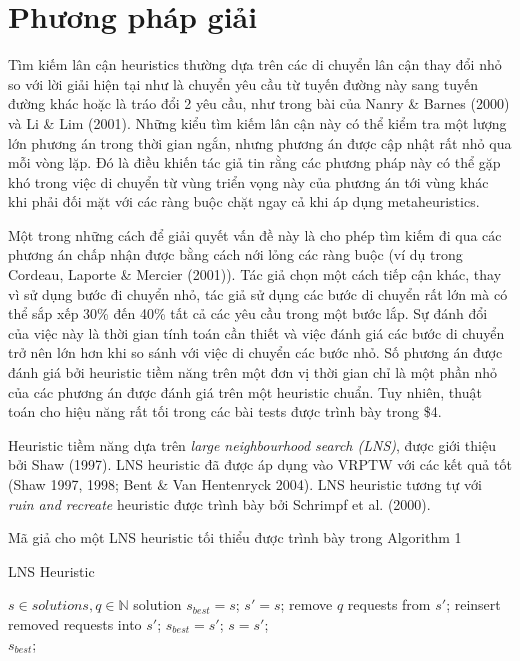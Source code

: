 \chapter{Phương pháp giải}
Tìm kiếm lân cận heuristics thường dựa trên các di chuyển lân cận thay đổi nhỏ so với lời giải hiện tại như là chuyển yêu cầu từ tuyến đường này sang tuyến đường khác hoặc là tráo đổi 2 yêu cầu, như trong bài của Nanry \& Barnes (2000) và Li \& Lim (2001). Những kiểu tìm kiếm lân cận này có thể kiểm tra một lượng lớn phương án trong thời gian ngắn, nhưng phương án được cập nhật rất nhỏ qua mỗi vòng lặp. Đó là điều khiến tác giả tin rằng các phương pháp này có thể gặp khó trong việc di chuyển từ vùng triển vọng này của phương án tới vùng khác khi phải đối mặt với các ràng buộc chặt ngay cả khi áp dụng metaheuristics.

Một trong những cách để giải quyết vấn đề này là cho phép tìm kiếm đi qua các phương án chấp nhận được bằng cách nới lỏng các ràng buộc (ví dụ trong Cordeau, Laporte \& Mercier (2001)). Tác giả chọn một cách tiếp cận khác, thay vì sử dụng bước đi chuyển nhỏ, tác giả sử dụng các bước di chuyển rất lớn mà có thể sắp xếp 30\% đến 40\% tất cả các yêu cầu trong một bước lắp. Sự đánh đổi của việc này là thời gian tính toán cần thiết và việc đánh giá các bước di chuyển trở nên lớn hơn khi so sánh với việc di chuyển các bước nhỏ. Số phương án được đánh giá bởi heuristic tiềm năng trên một đơn vị thời gian chỉ là một phần nhỏ của các phương án được đánh giá trên một heuristic chuẩn. Tuy nhiên, thuật toán cho hiệu năng rất tối trong các bài tests được trình bày trong \$4.

Heuristic tiềm năng dựa trên \textit{large neighbourhood search (LNS)}, được giới thiệu bởi Shaw (1997). LNS heuristic đã được áp dụng vào VRPTW với các kết quả tốt (Shaw 1997, 1998; Bent \& Van Hentenryck 2004). LNS heuristic tương tự với \textit{ruin and recreate} heuristic được trình bày bởi Schrimpf et al. (2000).

Mã giả cho một LNS heuristic tối thiểu được trình bày trong Algorithm 1

\begin{algorithm}
	\caption{LNS Heuristic} 
	\begin{algorithmic}[1]
        \Require $s \in {solutions}, q \in \mathbb{N}$
        \State solution $s_{best} = s$;
				\Repeat
					\State $s'=s$;
					\State remove $q$ requests from $s'$;
					\State reinsert removed requests into $s'$;
						\State $s_{best} = s'$;
					\EndIf
						\State $s=s'$;
					\EndIf
				\\
				\Return $s_{best}$;
	\end{algorithmic} 
\end{algorithm}

